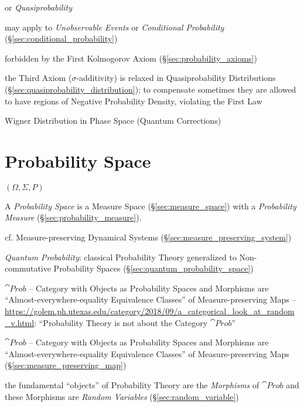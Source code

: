 or \emph{Quasiprobability}

may apply to \emph{Unobservable Events} or \emph{Conditional Probability}
(\S\ref{sec:conditional_probability})

forbidden by the First Kolmogorov Axiom (\S\ref{sec:probability_axioms})

the Third Axiom ($\sigma$-additivity) is relaxed in Quasiprobability
Distributions (\S\ref{sec:quasiprobability_distribution}); to compensate
sometimes they are allowed to have regions of Negative Probability Density,
violating the First Law

Wigner Distribution in Phase Space (Quantum Corrections)



\section{Probability Space}\label{sec:probability_space}

$(\Omega, \Sigma, P)$

A \emph{Probability Space} is a Measure Space (\S\ref{sec:measure_space}) with a
\emph{Probability Measure} (\S\ref{sec:probability_measure}).

\fist cf. Measure-preserving Dynamical Systems
(\S\ref{sec:measure_preserving_system})

\fist \emph{Quantum Probability}: classical Probability Theory generalized to
Non-commutative Probability Spaces (\S\ref{sec:quantum_probability_space})

$\cat{Prob}$ -- Category with Objects as Probability Spaces and Morphisms are
``Almost-everywhere-equality Equivalence Classes'' of Measure-preserving Maps
--
\url{https://golem.ph.utexas.edu/category/2018/09/a_categorical_look_at_random_v.html}:
``Probability Theory is not about the Category $\cat{Prob}$''

$\cat{Prob}$ -- Category with Objects as Probability Spaces and Morphisms are
``Almost-everywhere-equality Equivalence Classes'' of Measure-preserving Maps
(\S\ref{sec:measure_preserving_map})

the fundamental ``objects'' of Probability Theory are the \emph{Morphisms} of
$\cat{Prob}$ and these Morphisms are \emph{Random Variables}
(\S\ref{sec:random_variable})



